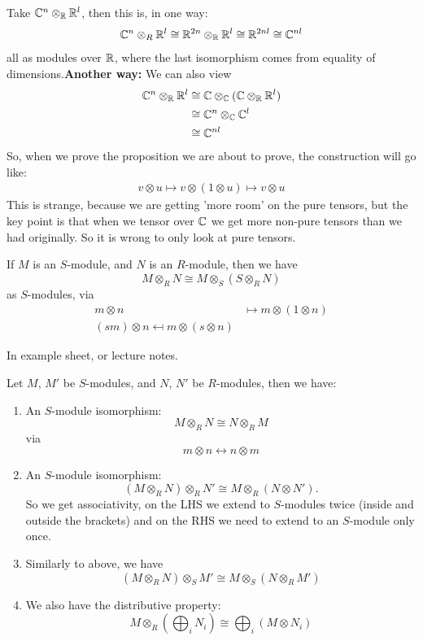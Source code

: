\documentclass{article}
\begin{document}
\begin{ex}
    Take $\mathbb{C}^{n} \otimes_{\mathbb{R}} \mathbb{R}^{l}$, then this is, in one way:
    \[ \mathbb{C}^{n} \otimes_{R} \mathbb{R}^{l} \cong \mathbb{R}^{2n} \otimes_{\mathbb{R}} \mathbb{R}^{l} \cong \mathbb{R}^{2nl} \cong \mathbb{C}^{nl}\] all as modules over $\mathbb{R}$, where the last isomorphism comes from equality of dimensions.\gap \textbf{Another way: } We can also view 
    \begin{align*} 
        \mathbb{C}^{n} \otimes_{\mathbb{R}} \mathbb{R}^{l} &\cong \mathbb{C} \otimes_{\mathbb{C}} (\mathbb{C} \otimes_{\mathbb{R}} \mathbb{R}^{l})\\
        &\cong \mathbb{C}^{n} \otimes_{\mathbb{C}} \mathbb{C}^{l}\\
        &\cong \mathbb{C}^{nl}
    \end{align*}
    So, when we prove the proposition we are about to prove, the construction will go like: \begin{align*}
        v \otimes u \mapsto v \otimes (1 \otimes u) \mapsto v \otimes u
    \end{align*}
    This is strange, because we are getting 'more room' on the pure tensors, but the key point is that when we tensor over $\mathbb{C}$ we get more non-pure tensors than we had originally. So it is wrong to only look at pure tensors.
\end{ex}
\begin{fancyprop}{}
    If $M$ is an $S$-module, and $N$ is an $R$-module, then we have \[ M \otimes_{R} N \cong M \otimes_{S} (S \otimes_{R} N)\] as $S$-modules, via \begin{align*}
        m \otimes n &\mapsto m \otimes (1 \otimes n)\\
        (sm) \otimes n \mapsfrom m \otimes (s \otimes n)
    \end{align*}
\end{fancyprop}
\proof In example sheet, or lecture notes.
\begin{fancyprop}{}
    Let $M$, $M'$ be $S$-modules, and $N$, $N'$ be $R$-modules, then we have: \begin{enumerate} 
        \item An $S$-module isomorphism: \[ M \otimes_{R} N \cong N \otimes_{R} M\] via \[m \otimes n \leftrightarrow n \otimes m\]
        \item  An $S$-module isomorphism: \[ (M \otimes_{R} N) \otimes_{R} N' \cong M \otimes_{R} (N \otimes N').\] So we get associativity, on the LHS we extend to $S$-modules twice (inside and outside the brackets) and on the RHS we need to extend to an $S$-module only once.
        \item Similarly to above, we have \[(M \otimes_{R} N) \otimes_{S} M' \cong M \otimes_{S} (N \otimes_{R} M')\] 
        \item We also have the distributive property: \[ M \otimes_{R} (\bigoplus_{i} N_{i}) \cong \bigoplus_{i} \left( M \otimes N_{i}\right)\]
    \end{enumerate}
\end{fancyprop}
\end{document}
